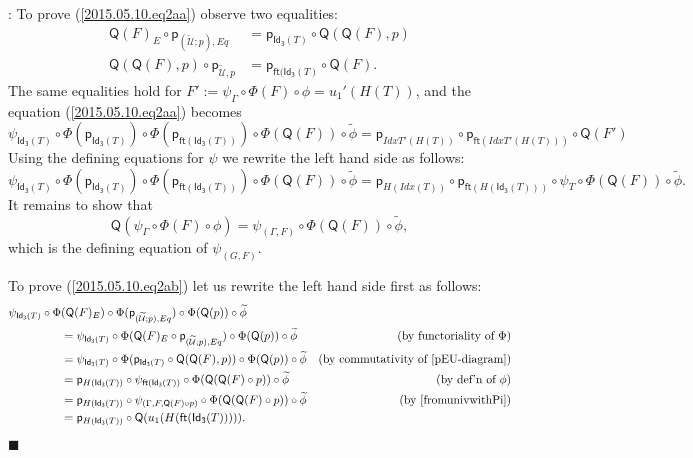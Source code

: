 \documentclass[12pt]{article}
\numberwithin{equation}{section}
\newenvironment{eq}{\begin{equation}}{\end{equation}}
\newenvironment{myproof}{{\bf Proof}:}{$\blacksquare$ \vskip 5mm }
\newcommand{\by}[1]{\text{(by #1)}}
\newcommand{\wt}{\widetilde}
\newcommand{\ft}{\mathsf{ft}}
\newcommand{\p}{\mathsf{p}}
\newcommand{\Idx}{\mathsf{Id_3}} %
\newcommand{\U}{\mathcal{U}}
\newcommand{\Q}{\mathsf{Q}}
\begin{document}
\begin{myproof}
To prove (\ref{2015.05.10.eq2aa}) observe two equalities:
\begin{align}
  \Q(F)_E\circ \p_{(\wt{\U};p),Eq} & =\p_{\Idx(T)}\circ \Q(\Q(F),p) \label{usefulequal3} \\
  \Q(\Q(F),p)\circ \p_{\wt{\U},p} & =\p_{\ft(\Idx(T)}\circ \Q(F).  \label{usefulequal4}
\end{align}
%
The same equalities hold for $F' := \psi_{\Gamma}\circ\Phi(F)\circ
\phi=u_1'(H(T))$, and the equation (\ref{2015.05.10.eq2aa}) becomes
%
$$\psi_{\Idx(T)}\circ \Phi(\p_{\Idx(T)})\circ \Phi(\p_{\ft(\Idx(T))})\circ
\Phi(\Q(F))\circ \wt{\phi}=\p_{IdxT'(H(T))}\circ \p_{\ft(IdxT'(H(T)))}\circ \Q(F')$$
%
Using the defining equations for $\psi$ we rewrite the left hand side as follows:
%
$$\psi_{\Idx(T)}\circ \Phi(\p_{\Idx(T)})\circ \Phi(\p_{\ft(\Idx(T))})\circ
\Phi(\Q(F))\circ \wt{\phi}=\p_{H(Idx(T))}\circ \p_{\ft(H(\Idx(T)))}\circ
\psi_{T}\circ \Phi(\Q(F))\circ \wt{\phi}.$$
%
It remains to show that
%
\begin{eq}
  \Q(\psi_{\Gamma}\circ \Phi(F)\circ \phi)=\psi_{(\Gamma,F)}\circ \Phi(\Q(F))\circ \wt{\phi},  \label{eqn13}
\end{eq}%
which is the defining equation of $\psi_{(G,F)}$.

To prove (\ref{2015.05.10.eq2ab}) let us rewrite the left hand side first as follows:
%
\begin{align*}
  \psi_{\Idx(T)}\circ \Phi&(\Q(F)_E)\circ \Phi(\p_{(\wt{\U};p),Eq})\circ \Phi(\Q(p))\circ \wt{\phi} \\
    & = \psi_{\Idx(T)}\circ \Phi(\Q(F)_E \circ \p_{(\wt{\U};p),Eq})\circ \Phi(\Q(p))\circ \wt{\phi} & \by{functoriality of $\Phi$} \\
    & = \psi_{\Idx(T)}\circ \Phi(\p_{\Idx(T)}\circ \Q(\Q(F),p))\circ \Phi(\Q(p))\circ\wt{\phi} & \by{commutativity of \ref{pEU-diagram}} \\
    & = \p_{H(\Idx(T))}\circ \psi_{\ft(\Idx(T))}\circ \Phi(\Q(\Q(F)\circ p))\circ \wt{\phi} & \by{def'n of $\phi$} \\
    & = \p_{H(\Idx(T))}\circ \psi_{(\Gamma,F,\Q(F)\circ p)}\circ \Phi(\Q(\Q(F)\circ p))\circ \wt{\phi} & \by{\cite[Lemma 3.2]{fromunivwithPi}} \\
    & = \p_{H(\Idx(T))}\circ \Q(u_1(H(\ft(\Idx(T))))).
\end{align*}


\end{myproof}
\end{document}
